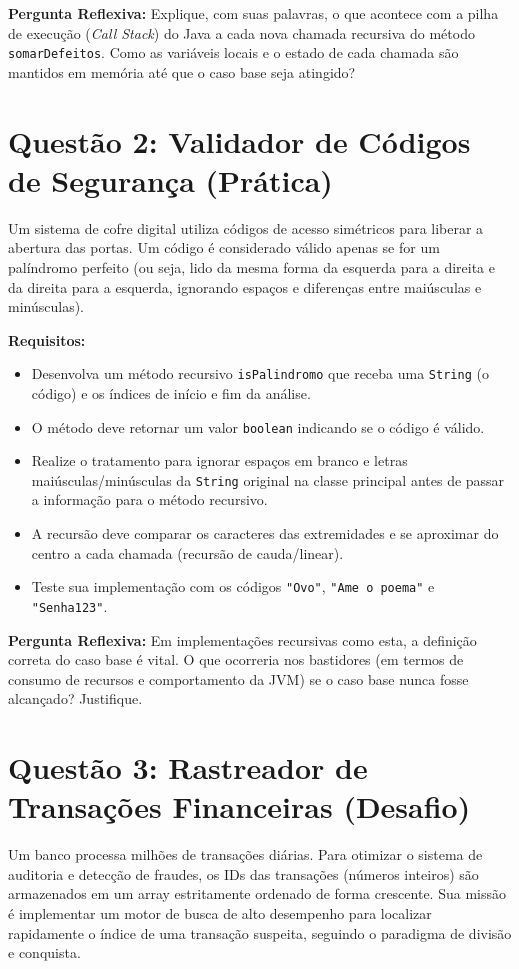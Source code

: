 \documentclass[12pt, a4paper]{article}
\begin{document}
\textbf{Pergunta Reflexiva:} Explique, com suas palavras, o que acontece com a pilha de execução (\textit{Call Stack}) do Java a cada nova chamada recursiva do método \texttt{somarDefeitos}. Como as variáveis locais e o estado de cada chamada são mantidos em memória até que o caso base seja atingido?

\vspace{0.2cm}

\section*{Questão 2: Validador de Códigos de Segurança (Prática)}
Um sistema de cofre digital utiliza códigos de acesso simétricos para liberar a abertura das portas. Um código é considerado válido apenas se for um palíndromo perfeito (ou seja, lido da mesma forma da esquerda para a direita e da direita para a esquerda, ignorando espaços e diferenças entre maiúsculas e minúsculas).

\textbf{Requisitos:}
\begin{itemize}
    \item Desenvolva um método recursivo \texttt{isPalindromo} que receba uma \texttt{String} (o código) e os índices de início e fim da análise.
    \item O método deve retornar um valor \texttt{boolean} indicando se o código é válido.
    \item Realize o tratamento para ignorar espaços em branco e letras maiúsculas/minúsculas da \texttt{String} original na classe principal antes de passar a informação para o método recursivo.
    \item A recursão deve comparar os caracteres das extremidades e se aproximar do centro a cada chamada (recursão de cauda/linear).
    \item Teste sua implementação com os códigos \texttt{"Ovo"}, \texttt{"Ame o poema"} e \texttt{"Senha123"}.
\end{itemize}

\textbf{Pergunta Reflexiva:} Em implementações recursivas como esta, a definição correta do caso base é vital. O que ocorreria nos bastidores (em termos de consumo de recursos e comportamento da JVM) se o caso base nunca fosse alcançado? Justifique.

\vspace{0.2cm}

\section*{Questão 3: Rastreador de Transações Financeiras (Desafio)}
Um banco processa milhões de transações diárias. Para otimizar o sistema de auditoria e detecção de fraudes, os IDs das transações (números inteiros) são armazenados em um array estritamente ordenado de forma crescente. Sua missão é implementar um motor de busca de alto desempenho para localizar rapidamente o índice de uma transação suspeita, seguindo o paradigma de divisão e conquista.
\end{document}
